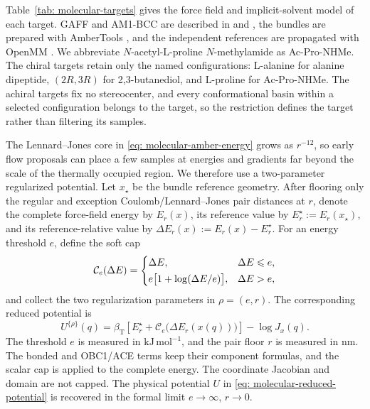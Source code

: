 \documentclass{article}
\begin{document}
Table~\ref{tab: molecular-targets} gives the force field and implicit-solvent model of each target. GAFF and AM1-BCC are described in \citet{wang2004gaff} and \citet{jakalian2002am1bcc}, the bundles are prepared with AmberTools \citep{case2023ambertools}, and the independent references are propagated with OpenMM \citep{eastman2017openmm}. We abbreviate \(N\)-acetyl-\(\mathrm L\)-proline \(N\)-methylamide as Ac-Pro-NHMe. The chiral targets retain only the named configurations: \(\mathrm L\)-alanine for alanine dipeptide, \((2R,3R)\) for 2,3-butanediol, and \(\mathrm L\)-proline for Ac-Pro-NHMe. The achiral targets fix no stereocenter, and every conformational basin within a selected configuration belongs to the target, so the restriction defines the target rather than filtering its samples.

The Lennard--Jones core in \eqref{eq: molecular-amber-energy} grows as \(r^{-12}\), so early flow proposals can place a few samples at energies and gradients far beyond the scale of the thermally occupied region. We therefore use a two-parameter regularized potential. Let \(x_\star\) be the bundle reference geometry. After flooring only the regular and exception Coulomb/Lennard--Jones pair distances at \(r\), denote the complete force-field energy by \(E_r(x)\), its reference value by \(E_r^\star:=E_r(x_\star)\), and its reference-relative value by \(\Delta E_r(x):=E_r(x)-E_r^\star\). For an energy threshold \(e\), define the soft cap
\begin{equation}
\mathcal C_e(\Delta E)=
\begin{cases}
\Delta E, & \Delta E\leqslant e,\\[2pt]
e\bigl[1+\log(\Delta E/e)\bigr], & \Delta E>e,
\end{cases}
\label{eq: molecular-regularizer}
\end{equation}
and collect the two regularization parameters in \(\rho=(e,r)\). The corresponding reduced potential is
\begin{equation}
U^{\{\rho\}}(q)
=\beta_{\mathrm T}\!\left[E_r^\star
+\mathcal C_e\bigl(\Delta E_r(x(q))\bigr)\right]-\log J_x(q).
\label{eq: regularized-molecular-potential}
\end{equation}
The threshold \(e\) is measured in \(\mathrm{kJ\,mol^{-1}}\), and the pair floor \(r\) is measured in \(\mathrm{nm}\). The bonded and OBC1/ACE terms keep their component formulas, and the scalar cap is applied to the complete energy. The coordinate Jacobian and domain are not capped. The physical potential \(U\) in \eqref{eq: molecular-reduced-potential} is recovered in the formal limit \(e\to\infty\), \(r\to0\).
\end{document}

